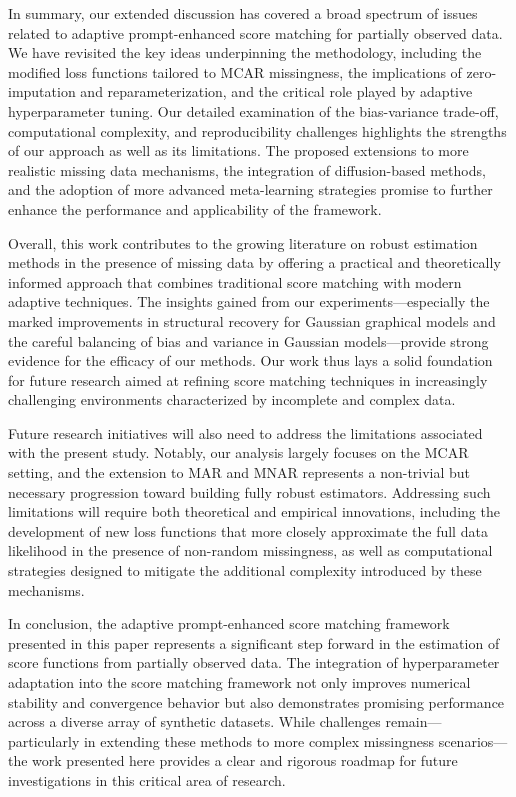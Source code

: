 \documentclass{article}
\begin{document}
In summary, our extended discussion has covered a broad spectrum of issues related to adaptive prompt-enhanced score matching for partially observed data. We have revisited the key ideas underpinning the methodology, including the modified loss functions tailored to MCAR missingness, the implications of zero-imputation and reparameterization, and the critical role played by adaptive hyperparameter tuning. Our detailed examination of the bias-variance trade-off, computational complexity, and reproducibility challenges highlights the strengths of our approach as well as its limitations. The proposed extensions to more realistic missing data mechanisms, the integration of diffusion-based methods, and the adoption of more advanced meta-learning strategies promise to further enhance the performance and applicability of the framework.

Overall, this work contributes to the growing literature on robust estimation methods in the presence of missing data by offering a practical and theoretically informed approach that combines traditional score matching with modern adaptive techniques. The insights gained from our experiments—especially the marked improvements in structural recovery for Gaussian graphical models and the careful balancing of bias and variance in Gaussian models—provide strong evidence for the efficacy of our methods. Our work thus lays a solid foundation for future research aimed at refining score matching techniques in increasingly challenging environments characterized by incomplete and complex data.

Future research initiatives will also need to address the limitations associated with the present study. Notably, our analysis largely focuses on the MCAR setting, and the extension to MAR and MNAR represents a non-trivial but necessary progression toward building fully robust estimators. Addressing such limitations will require both theoretical and empirical innovations, including the development of new loss functions that more closely approximate the full data likelihood in the presence of non-random missingness, as well as computational strategies designed to mitigate the additional complexity introduced by these mechanisms.

In conclusion, the adaptive prompt-enhanced score matching framework presented in this paper represents a significant step forward in the estimation of score functions from partially observed data. The integration of hyperparameter adaptation into the score matching framework not only improves numerical stability and convergence behavior but also demonstrates promising performance across a diverse array of synthetic datasets. While challenges remain—particularly in extending these methods to more complex missingness scenarios—the work presented here provides a clear and rigorous roadmap for future investigations in this critical area of research.
\end{document}
